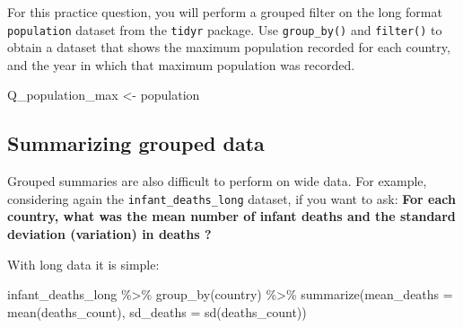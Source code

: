 \documentclass[
  letterpaper,
  DIV=11,
  numbers=noendperiod]{scrreprt}
\newenvironment{Shaded}{\begin{snugshade}}{\end{snugshade}}
\newcommand{\AttributeTok}[1]{\textcolor[rgb]{0.40,0.45,0.13}{#1}}
\newcommand{\FunctionTok}[1]{\textcolor[rgb]{0.28,0.35,0.67}{#1}}
\newcommand{\NormalTok}[1]{\textcolor[rgb]{0.00,0.23,0.31}{#1}}
\newcommand{\OtherTok}[1]{\textcolor[rgb]{0.00,0.23,0.31}{#1}}
\newcommand{\SpecialCharTok}[1]{\textcolor[rgb]{0.37,0.37,0.37}{#1}}
\begin{document}
\begin{tcolorbox}[enhanced jigsaw, titlerule=0mm, colback=white, left=2mm, breakable, opacitybacktitle=0.6, colbacktitle=quarto-callout-tip-color!10!white, colframe=quarto-callout-tip-color-frame, bottomtitle=1mm, opacityback=0, coltitle=black, arc=.35mm, toptitle=1mm, title=\textcolor{quarto-callout-tip-color}{\faLightbulb}\hspace{0.5em}{Practice}, leftrule=.75mm, toprule=.15mm, bottomrule=.15mm, rightrule=.15mm]

For this practice question, you will perform a grouped filter on the
long format \texttt{population} dataset from the \texttt{tidyr} package.
Use \texttt{group\_by()} and \texttt{filter()} to obtain a dataset that
shows the maximum population recorded for each country, and the year in
which that maximum population was recorded.

\begin{Shaded}
\begin{Highlighting}[]
\NormalTok{Q\_population\_max }\OtherTok{\textless{}{-}} 
\NormalTok{  population }
\end{Highlighting}
\end{Shaded}

\end{tcolorbox}

\subsection{Summarizing grouped data}\label{summarizing-grouped-data}

Grouped summaries are also difficult to perform on wide data. For
example, considering again the \texttt{infant\_deaths\_long} dataset, if
you want to ask: \textbf{For each country, what was the mean number of
infant deaths and the standard deviation (variation) in deaths ?}

With long data it is simple:

\begin{Shaded}
\begin{Highlighting}[]
\NormalTok{infant\_deaths\_long }\SpecialCharTok{\%\textgreater{}\%} 
  \FunctionTok{group\_by}\NormalTok{(country) }\SpecialCharTok{\%\textgreater{}\%} 
  \FunctionTok{summarize}\NormalTok{(}\AttributeTok{mean\_deaths =} \FunctionTok{mean}\NormalTok{(deaths\_count), }
            \AttributeTok{sd\_deaths =} \FunctionTok{sd}\NormalTok{(deaths\_count))}
\end{Highlighting}
\end{Shaded}
\end{document}
